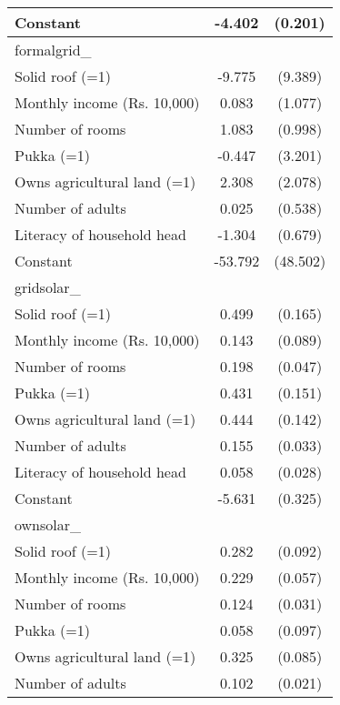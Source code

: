 \begin{table}[htbp]
\begin{tabular}{l*{1}{cc}}
Constant            &      -4.402\sym{***}&     (0.201)\\
\midrule
formalgrid\_         &                     &            \\
Solid roof (=1)     &      -9.775         &     (9.389)\\
Monthly income (Rs. 10,000)&       0.083         &     (1.077)\\
Number of rooms     &       1.083         &     (0.998)\\
Pukka (=1)          &      -0.447         &     (3.201)\\
Owns agricultural land (=1)&       2.308         &     (2.078)\\
Number of adults    &       0.025         &     (0.538)\\
Literacy of household head&      -1.304\sym{*}  &     (0.679)\\
Constant            &     -53.792         &    (48.502)\\
\midrule
gridsolar\_          &                     &            \\
Solid roof (=1)     &       0.499\sym{***}&     (0.165)\\
Monthly income (Rs. 10,000)&       0.143         &     (0.089)\\
Number of rooms     &       0.198\sym{***}&     (0.047)\\
Pukka (=1)          &       0.431\sym{***}&     (0.151)\\
Owns agricultural land (=1)&       0.444\sym{***}&     (0.142)\\
Number of adults    &       0.155\sym{***}&     (0.033)\\
Literacy of household head&       0.058\sym{**} &     (0.028)\\
Constant            &      -5.631\sym{***}&     (0.325)\\
\midrule
ownsolar\_           &                     &            \\
Solid roof (=1)     &       0.282\sym{***}&     (0.092)\\
Monthly income (Rs. 10,000)&       0.229\sym{***}&     (0.057)\\
Number of rooms     &       0.124\sym{***}&     (0.031)\\
Pukka (=1)          &       0.058         &     (0.097)\\
Owns agricultural land (=1)&       0.325\sym{***}&     (0.085)\\
Number of adults    &       0.102\sym{***}&     (0.021)\\

\end{tabular}
\end{table}
